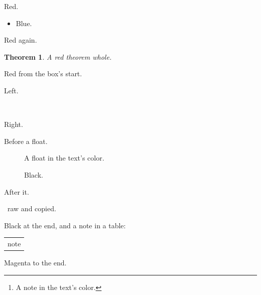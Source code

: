 \documentclass{article}
\newtheorem{theorem}{Theorem}
\begin{document}
{\color{red} Red. {\color{blue}\begin{itemize}\item Blue.\end{itemize}} Red again.}

{\color{red}\begin{theorem}A red theorem whole.\end{theorem}}

\begin{tcolorbox}\color{red} Red from the box's start.\end{tcolorbox}

{\color{red}\noindent\begin{minipage}{0.4\linewidth}Left.\end{minipage}~\begin{minipage}{0.4\linewidth}Right.\end{minipage}}

{\color{red} Before a float.\begin{figure}[h]A float in the text's color.\caption{Black.}\end{figure} After it.}

\hbox{\color{red} raw} and  copied.

Black at the end, and a note in a table:
\begin{tabular}{l}note\footnotemark\end{tabular}

\color{magenta} Magenta to the end.

\begin{abstract}A magenta abstract.\footnote{A note in the text's color.}\end{abstract}
\end{document}
